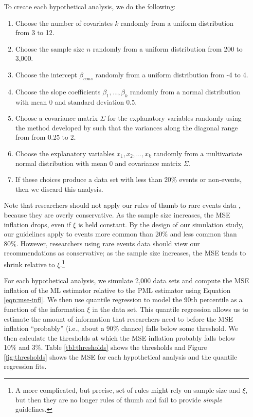 \documentclass[12pt]{article}
\begin{document}
To create each hypothetical analysis, we do the following:
\begin{enumerate}
\item Choose the number of covariates $k$ randomly from a uniform distribution from 3 to 12.
\item Choose the sample size $n$ randomly from a uniform distribution from 200 to 3,000.
\item Choose the intercept $\beta_{cons}$ randomly from a uniform distribution from -4 to 4.
\item Choose the slope coefficients $\beta_1,...,\beta_k$ randomly from a normal distribution with mean 0 and standard deviation 0.5.
\item Choose a covariance matrix $\Sigma$ for the explanatory variables randomly using the method developed by \cite{Joe2006} such that the variances along the diagonal range from from 0.25 to 2.
\item Choose the explanatory variables $x_1, x_2,...,x_k$ randomly from a multivariate normal distribution with mean 0 and covariance matrix $\Sigma$. 
\item If these choices produce a data set with less than 20\% events or non-events, then we discard this analysis.
\end{enumerate}
Note that researchers should not apply our rules of thumb to rare events data \citep{KingZeng2001}, because they are overly conservative.
As the sample size increases, the MSE inflation drops, even if $\xi$ is held constant. 
By the design of our simulation study, our guidelines apply to events more common than 20\% and less common than 80\%.
However, researchers using rare events data should view our recommendations as conservative; as the sample size increases, the MSE tends to shrink relative to $\xi$.\footnote{A more complicated, but precise, set of rules might rely on sample size and $\xi$, but then they are no longer rules of thumb and fail to provide \textit{simple} guidelines.}

For each hypothetical analysis, we simulate 2,000 data sets and compute the MSE inflation of the ML estimator relative to the PML estimator using Equation \ref{eqn:mse-infl}.
We then use quantile regression to model the 90th percentile as a function of the information $\xi$ in the data set.
This quantile regression allows us to estimate the amount of information that researchers need to before the MSE inflation ``probably'' (i.e., about a 90\% chance) falls below some threshold.
We then calculate the thresholds at which the MSE inflation probably falls below 10\% and 3\%. Table \ref{tbl:thresholds} shows the thresholds and Figure \ref{fig:thresholds} shows the MSE for each hypothetical analysis and the quantile regression fits.
\end{document}
